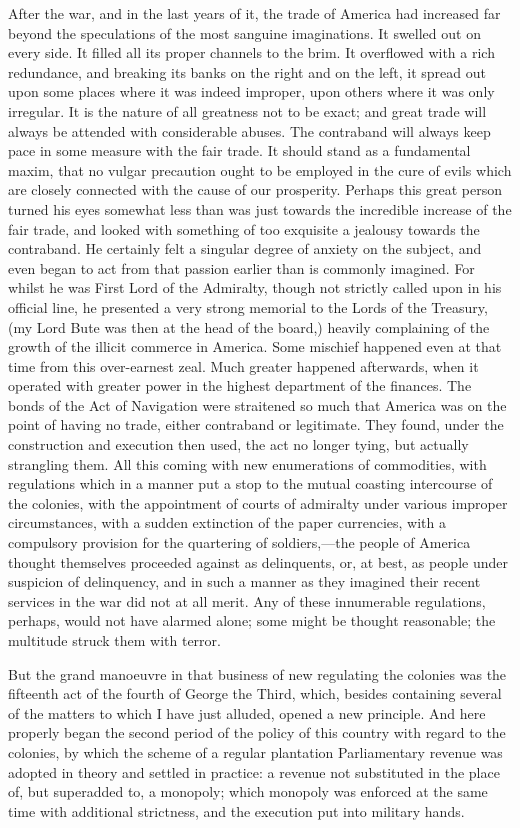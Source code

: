 After the war, and in the last years of it, the trade of America had increased far beyond the speculations of the most sanguine imaginations. It swelled out on every side. It filled all its proper channels to the brim. It overflowed with a rich redundance, and breaking its banks on the right and on the left, it spread out upon some places where it was indeed improper, upon others where it was only irregular. It is the nature of all greatness not to be exact; and great trade will always be attended with considerable abuses. The contraband will always keep pace in some measure with the fair trade. It should stand as a fundamental maxim, that no vulgar precaution ought to be employed in the cure of evils which are closely connected with the cause of our prosperity. Perhaps this great person turned his eyes somewhat less than was just towards the incredible increase of the fair trade, and looked with something of too exquisite a jealousy towards the contraband. He certainly felt a singular degree of anxiety on the subject, and even began to act from that passion earlier than is commonly imagined. For whilst he was First Lord of the Admiralty, though not strictly called upon in his official line, he presented a very strong memorial to the Lords of the Treasury, (my Lord Bute was then at the head of the board,) heavily complaining of the growth of the illicit commerce in America. Some mischief happened even at that time from this over-earnest zeal. Much greater happened afterwards, when it operated with greater power in the highest department of the finances. The bonds of the Act of Navigation were straitened so much that America was on the point of having no trade, either contraband or legitimate. They found, under the construction and execution then used, the act no longer tying, but actually strangling them. All this coming with new enumerations of commodities, with regulations which in a manner put a stop to the mutual coasting intercourse of the colonies, with the appointment of courts of admiralty under various improper circumstances, with a sudden extinction of the paper currencies, with a compulsory provision for the quartering of soldiers,—the people of America thought themselves proceeded against as delinquents, or, at best, as people under suspicion of delinquency, and in such a manner as they imagined their recent services in the war did not at all merit. Any of these innumerable regulations, perhaps, would not have alarmed alone; some might be thought reasonable; the multitude struck them with terror.

But the grand manoeuvre in that business of new regulating the colonies was the fifteenth act of the fourth of George the Third, which, besides containing several of the matters to which I have just alluded, opened a new principle. And here properly began the second period of the policy of this country with regard to the colonies, by which the scheme of a regular plantation Parliamentary revenue was adopted in theory and settled in practice: a revenue not substituted in the place of, but superadded to, a monopoly; which monopoly was enforced at the same time with additional strictness, and the execution put into military hands.

